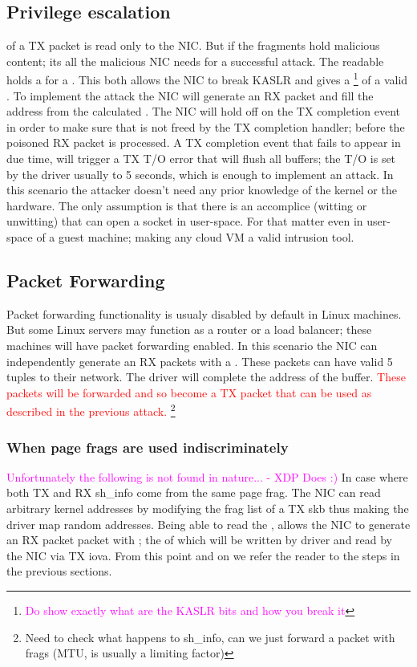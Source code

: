 \subsection{Privilege escalation}
\shinfo of a TX packet is read only to the NIC.
But if the fragments hold malicious content; its all the malicious NIC needs for a successful attack. The readable \shinfo holds a \kva for a \page. This both allows the NIC to break KASLR and gives a \kva\footnote{\textcolor{magenta}{Do show exactly what are the KASLR bits and how you break it}} of a valid \mabaf. To implement the attack the NIC will generate an RX packet and fill the \uarg address from the calculated \kva.
The NIC will hold off on the TX completion event in order to make sure that \kva is not freed by the TX completion handler; before the poisoned RX packet is processed. A TX completion event that fails to appear in due time, will trigger a TX T/O error that will flush all buffers; the T/O is set by the driver usually to 5 seconds, which is enough to implement an attack.\newline
In this scenario the attacker doesn't need any prior knowledge of the kernel or the hardware. The only assumption is that there is an accomplice (witting or unwitting) that can open a socket in user-space. For that matter even in user-space of a guest machine; making any cloud VM a valid intrusion tool.

\subsection{Packet Forwarding}
Packet forwarding functionality is usualy disabled by default in Linux machines. But some Linux servers may function as a router or a load balancer; these machines will have packet forwarding enabled. In this scenario the NIC can independently generate an RX packets with a \mabaf. These packets can have valid 5 tuples to their network. The driver will complete the \page address of the buffer. \textcolor{red}{These packets will be forwarded and so become a TX packet that can be used as described in the previous attack.} \footnote{Need to check what happens to sh\_info, can we just forward a packet with frags (MTU, is usually a limiting factor)}

\subsubsection{When page frags are used indiscriminately}
\textcolor{magenta}{Unfortunately the following is not found in nature... - XDP Does :)}\newline
In case where both TX and RX sh\_info come from the same page frag. The NIC can read arbitrary kernel addresses by modifying the frag list of a TX skb thus making the driver map random addresses.
Being able to read the \shinfo, allows the NIC to generate an RX packet packet with \mabaf; the \kva of which will be written by driver and read by the NIC via TX iova. From this point and on we refer the reader to the steps in the previous sections.

